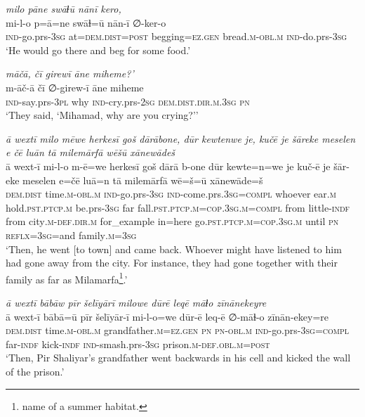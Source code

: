 \ea \label{BP.144}
\textit{milo pāne swāɫū nānī kero,} \\ 
\gll mi-l-o p=ā=ne swāɫ=ū nān-ī ∅-ker-o \\ 
 \textsc{ind-}go.prs\textsc{-3sg} at=\textsc{dem.dist}\textsc{=\textsc{post}} begging\textsc{=ez.gen} bread\textsc{.m}\textsc{-obl}\textsc{.m} \textsc{ind-}do.prs\textsc{-3sg} \\ 
\glt `He would go there and beg for some food.'
\z 
 
\ea \label{BP.154}
\textit{māčā, čī girewī āne miheme?’} \\ 
\gll m-āč-ā čī ∅-girew-ī āne miheme \\ 
 \textsc{ind-}say.prs\textsc{-3pl} why \textsc{ind-}cry.prs-\textsc{2sg} \textsc{dem.dist}\textsc{.dir}\textsc{.m}\textsc{.3sg} \textsc{pn} \\ 
\glt `They said, ‘Mihamad, why are you crying?’'
\z 
 
\ea \label{BP.167}
\textit{ā wextī milo mēwe herkesī goš dārābone, dūr kewtenwe je, kučē je šāreke meselen e čē luān tā milemārfā wēšū xānewādeš} \\ 
\gll ā wext-ī mi-l-o m-ē=we herkesī goš dārā b-one dūr kewte=n=we je kuč-ē je šār-eke meselen e=čē luā=n tā milemārfā wē=š=ū xānewāde=š \\ 
 \textsc{dem.dist} time\textsc{.m}\textsc{-obl}\textsc{.m} \textsc{ind-}go.prs\textsc{-3sg} \textsc{ind-}come.prs\textsc{.3sg}\textsc{=compl} whoever ear\textsc{.m} hold\textsc{.pst}\textsc{.ptcp}\textsc{.m} be.prs\textsc{-3sg} far fall\textsc{.pst}\textsc{.ptcp}\textsc{.m}\textsc{=cop}\textsc{.3sg}\textsc{.m}\textsc{=compl} from little\textsc{-indf} from city\textsc{.m}\textsc{-def}\textsc{.dir}\textsc{.m} for\_example in=here go\textsc{.pst}\textsc{.ptcp}\textsc{.m}\textsc{=cop}\textsc{.3sg}\textsc{.m} until \textsc{pn} \textsc{reflx}\textsc{=3sg}=and family\textsc{.m}\textsc{=3sg} \\ 
\glt `Then, he went [to town] and came back. Whoever might have listened to him had gone away from the city. For instance, they had gone together with their family as far as Milamarfa\footnote{name of a summer habitat.}.'
\z 
 
\ea \label{BP.168}
\textit{ā wextī bābāw pīr šelīyārī milowe dūrē leqē māɫo zīnānekeyre} \\ 
\gll ā wext-ī bābā=ū pīr šelīyār-ī mi-l-o=we dūr-ē leq-ē ∅-māɫ-o zīnān-ekey=re \\ 
 \textsc{dem.dist} time\textsc{.m}\textsc{-obl}\textsc{.m} grandfather\textsc{.m}\textsc{=ez.gen} \textsc{pn} \textsc{pn}\textsc{-obl}\textsc{.m} \textsc{ind-}go.prs\textsc{-3sg}\textsc{=compl} far\textsc{-indf} kick\textsc{-indf} \textsc{ind-}smash.prs\textsc{-3sg} prison\textsc{.m}\textsc{-def}\textsc{.obl}\textsc{.m}\textsc{=\textsc{post}} \\ 
\glt `Then, Pir Shaliyar’s grandfather went backwards in his cell and kicked the wall of the prison.'
\z 
 
